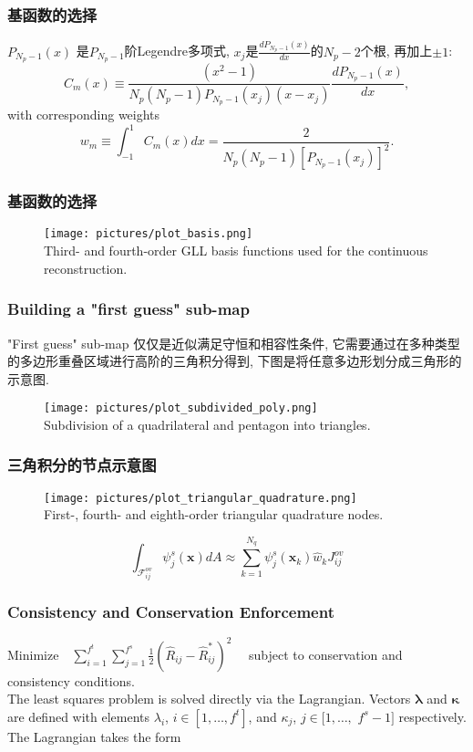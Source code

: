 \documentclass[unknownkeysallowed]{beamer}
\newcommand{\vb}{\mathbf}
\newcommand{\vg}{\boldsymbol}
\newcommand{\diff}[2]{\frac{d #1}{d #2}}
\begin{document}
\begin{spacing}{1.2}
\begin{frame}
\frametitle{基函数的选择}
$P_{N_p-1}(x)$ 是$P_{N_p-1}$阶Legendre多项式, $x_j$是$\diff{P_{N_p-1}(x)}{x}$的$N_p-2$个根, 再加上$\pm 1$:
$$C_m(x) \equiv \frac{(x^2 - 1)}{N_p (N_p - 1) P_{N_p-1}(x_j) (x - x_j)} \diff{P_{N_p-1}(x)}{x},$$
with corresponding weights
$$w_m \equiv \int_{-1}^{1} C_m(x) dx = \frac{2}{N_p (N_p-1) \left[ P_{N_p-1}(x_j) \right]^2}.$$
\end{frame}

\begin{frame}
\frametitle{基函数的选择}
\begin{figure}[c]
\texttt{[image: pictures/plot\_basis.png]}
\\
\tiny{Third- and fourth-order GLL basis functions used for the continuous reconstruction.}
\end{figure}
\end{frame}

\begin{frame}
\frametitle{Building a "first guess" sub-map}
"First guess" sub-map 仅仅是近似满足守恒和相容性条件, 它需要通过在多种类型的多边形重叠区域进行高阶的三角积分得到, 下图是将任意多边形划分成三角形的示意图.
\begin{figure}[c]
\texttt{[image: pictures/plot\_subdivided\_poly.png]}
\\
\tiny{Subdivision of a quadrilateral and pentagon into triangles.}
\end{figure}
\end{frame}

\begin{frame}
\frametitle{三角积分的节点示意图}
\begin{figure}[c]
\texttt{[image: pictures/plot\_triangular\_quadrature.png]}
\\
\tiny{First-, fourth- and eighth-order triangular quadrature nodes.}
\end{figure}
$$\int_{\mathscr{F}_{ij}^{ov}}\psi_j^s(\vb{x})dA\approx \displaystyle{\sum_{k=1}^{N_q}}\psi_j^s(\vb{x}_k)\hat{w}_k J^{ov}_{ij}$$
\end{frame}


\begin{frame}
\frametitle{Consistency and Conservation Enforcement}
\scriptsize
{
$\mbox{Minimize} \quad \displaystyle{\sum_{i=1}^{f^t} \sum_{j=1}^{f^s}} \frac{1}{2} ( \hat{R}_{ij} - \hat{R}^{\ast}_{ij} )^2 \quad$ subject to conservation and consistency conditions.\\
\pause
The least squares problem is solved directly via the Lagrangian.  Vectors $\vg{\lambda}$ and $\vg{\kappa}$ are defined with elements $\lambda_i$, $i \in [1, \ldots, f^t]$, and $\kappa_j$, $j \in [1, \ldots,$  $ f^s-1]$ respectively.  The Lagrangian takes the form}


\end{frame}
\end{spacing}
\end{document}
